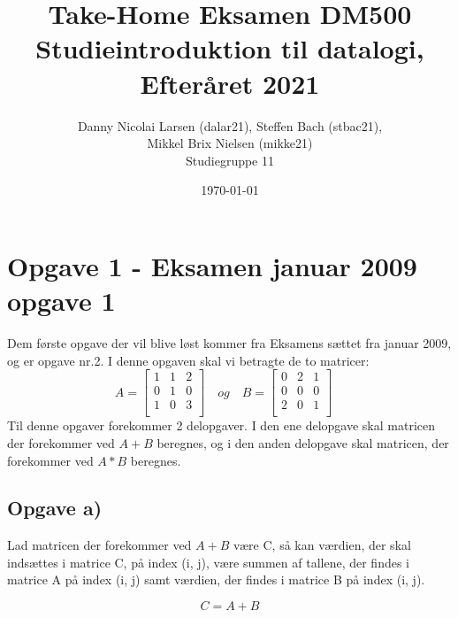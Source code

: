 \documentclass[20pt]{article}
\title{Take-Home Eksamen DM500 Studieintroduktion til datalogi, Efteråret 2021}
\author{Danny Nicolai Larsen (dalar21), Steffen Bach (stbac21),\\ Mikkel Brix Nielsen (mikke21) \\ Studiegruppe 11}
\date{\today}
\begin{document}
	\maketitle
	\newpage
	\section*{Opgave 1 - Eksamen januar 2009 opgave 1}
	Dem første opgave der vil blive løst kommer fra Eksamens sættet fra januar 2009, og er opgave nr.2.
	I denne opgaven skal vi betragte de to matricer:
	$$ 
	A = 
	\begin{bmatrix} 
		1 & 1 & 2 \\
		0 & 1 & 0 \\
		1 & 0 & 3 \\
	\end{bmatrix}
 	\quad og \quad B = 
	\begin{bmatrix} 
		0 & 2 & 1 \\
		0 & 0 & 0 \\
		2 & 0 & 1 \\
	\end{bmatrix}
	\quad
	$$
	Til denne opgaver forekommer 2 delopgaver. I den ene delopgave skal matricen der forekommer ved \(A+B\) beregnes, og i den anden delopgave skal matricen, der forekommer ved \(A*B\) beregnes.	
	
	\subsection*{Opgave a)}
	Lad matricen der forekommer ved \(A+B\) være C, så kan værdien, der skal indsættes i  matrice C, på index (i, j), være summen af tallene, der findes i matrice A på index (i, j) samt værdien, der findes i matrice B på index (i, j).
	
	\begin{equation}
		C = A+B
	\end{equation}
\end{document}
